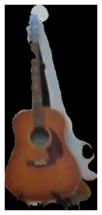 \begin{figure}[h!]
    \centering
    \begin{minipage}[b]{0.1\textwidth}
        \centering
        \includegraphics[width=\textwidth]{images/cropping_method_0.png}

\end{minipage}
\end{figure}
